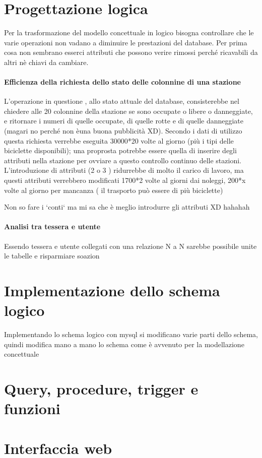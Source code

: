 \documentclass[a4paper,twoside]{article}
\begin{document}
\section{Progettazione logica}
Per la trasformazione del modello concettuale in logico bisogna controllare che le varie operazioni non vadano a diminuire le prestazioni del database.\newline
Per prima cosa non sembrano esserci attributi che possono verire rimossi perché ricavabili da altri nè chiavi da cambiare.

\paragraph{Efficienza della richiesta dello stato delle colonnine di una stazione}
L'operazione in questione , allo stato attuale del database, consisterebbe nel chiedere alle 20 colonnine della stazione se sono occupate o libere o danneggiate, e ritornare i numeri di quelle occupate, di quelle rotte e di quelle danneggiate (magari no perché non èuna buona pubblicità XD).\newline
Secondo i dati di utilizzo questa richiesta verrebbe eseguita 30000*20 volte al giorno (più i tipi delle biciclette disponibili); una proprosta potrebbe essere quella di inserire degli attributi nella stazione per ovviare a questo controllo continuo delle stazioni.\newline
L'introduzione di attributi (2 o 3 ) ridurrebbe di molto il carico di lavoro, ma questi attributi verrebbero modificati 1700*2 volte al giorni dai noleggi, 200*x volte al giorno per mancanza ( il trasporto può essere di più biciclette)

Non so fare i `conti` ma mi sa che è meglio introdurre gli attributi XD hahahah

\paragraph{Analisi tra tessera e utente}
Essendo tessera e utente collegati con una relazione N a N sarebbe possibile unite le tabelle e risparmiare soazion

\section{Implementazione dello schema logico}
Implementando lo schema logico con mysql si modificano varie parti dello schema, quindi modifica mano a mano lo schema come è avvenuto per la modellazione concettuale

\section{Query, procedure, trigger e funzioni}

\section{Interfaccia web}
\end{document}
